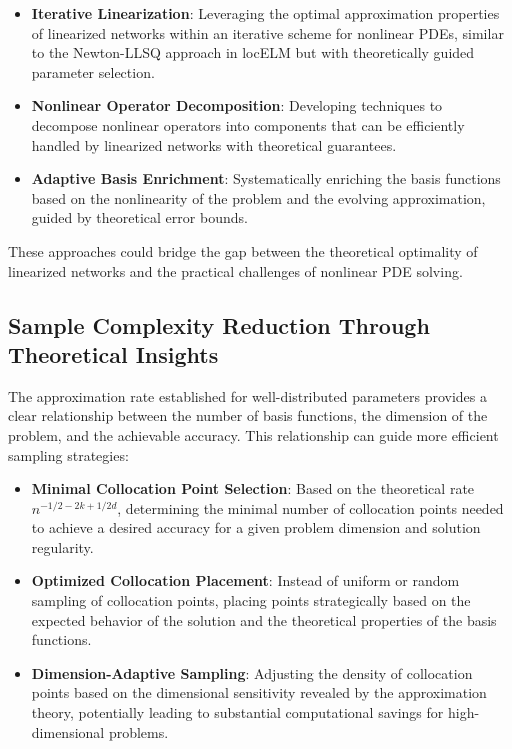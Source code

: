 \documentclass[11pt]{article}
\begin{document}
\begin{itemize}
    \item \textbf{Iterative Linearization}: Leveraging the optimal approximation properties of linearized networks within an iterative scheme for nonlinear PDEs, similar to the Newton-LLSQ approach in locELM but with theoretically guided parameter selection.
    
    \item \textbf{Nonlinear Operator Decomposition}: Developing techniques to decompose nonlinear operators into components that can be efficiently handled by linearized networks with theoretical guarantees.
    
    \item \textbf{Adaptive Basis Enrichment}: Systematically enriching the basis functions based on the nonlinearity of the problem and the evolving approximation, guided by theoretical error bounds.
\end{itemize}

These approaches could bridge the gap between the theoretical optimality of linearized networks and the practical challenges of nonlinear PDE solving.

\subsection{Sample Complexity Reduction Through Theoretical Insights}

The approximation rate established for well-distributed parameters provides a clear relationship between the number of basis functions, the dimension of the problem, and the achievable accuracy. This relationship can guide more efficient sampling strategies:

\begin{itemize}
    \item \textbf{Minimal Collocation Point Selection}: Based on the theoretical rate $n^{-1/2-2k+1/2d}$, determining the minimal number of collocation points needed to achieve a desired accuracy for a given problem dimension and solution regularity.
    
    \item \textbf{Optimized Collocation Placement}: Instead of uniform or random sampling of collocation points, placing points strategically based on the expected behavior of the solution and the theoretical properties of the basis functions.
    
    \item \textbf{Dimension-Adaptive Sampling}: Adjusting the density of collocation points based on the dimensional sensitivity revealed by the approximation theory, potentially leading to substantial computational savings for high-dimensional problems.
\end{itemize}
\end{document}
